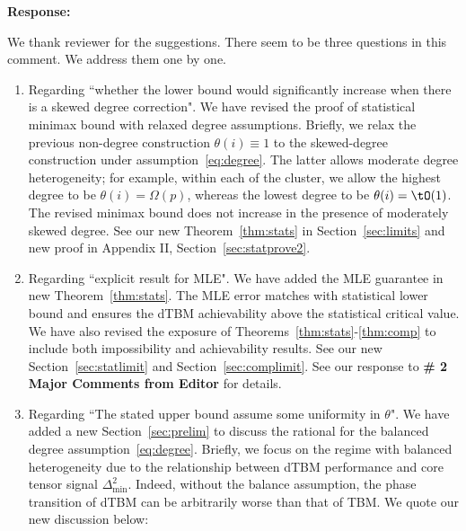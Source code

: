 \documentclass[11pt]{article}
\theoremstyle{definition}
\theoremstyle{definition}
\def\fixme#1#2{\textbf{\color{red}[FIXME (#1): #2]}}
\begin{document}
\begin{enumerate}[wide, labelwidth=!, labelindent=0pt]
\textbf{Response:}  


We thank reviewer for the suggestions. There seem to be three questions in this comment. We address them one by one.

\begin{enumerate}
    \item Regarding ``whether the lower bound would significantly increase when there is a skewed degree correction". We have revised the proof of statistical minimax bound with relaxed degree assumptions. Briefly, we relax the previous non-degree construction $\theta(i)\equiv 1$ to the skewed-degree construction under assumption~\eqref{eq:degree}. The latter allows moderate degree heterogeneity; for example, within each of the cluster, we allow the highest degree to be $\theta(i) = \Omega(p)$, whereas the lowest degree to be $\theta(i)=\tO(1)$. The revised minimax bound does not increase in the presence of moderately skewed degree. See our new Theorem~\ref{thm:stats} in Section~\ref{sec:limits} and new proof in Appendix II, Section~\ref{sec:statprove2}. 
    
       
    \item  Regarding ``explicit result for MLE". We have added the MLE guarantee in new Theorem~\ref{thm:stats}. The MLE error matches with statistical lower bound and ensures the dTBM achievability above the statistical critical value. We have also revised the exposure of Theorems~\ref{thm:stats}-\ref{thm:comp} to include both impossibility and achievability results. See our new Section~\ref{sec:statlimit} and Section~\ref{sec:complimit}. See our response to {\bf \# 2 Major Comments from Editor} for details.
    
    \item Regarding ``The stated upper bound assume some uniformity in $\theta$". We have added a new Section~\ref{sec:prelim} to discuss the rational for the balanced degree assumption~\eqref{eq:degree}. Briefly, we focus on the regime with balanced heterogeneity due to the relationship between dTBM performance and core tensor signal $\Delta_{\min}^2$. Indeed, without the balance assumption, the phase transition of dTBM can be arbitrarily worse than that of TBM. We quote our new discussion below:
    

\end{enumerate}
\end{enumerate}
\end{document}

